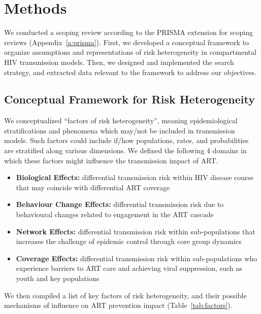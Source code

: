 \section{Methods}
\label{s:meth}
We conducted a scoping review according to the PRISMA extension for scoping reviews
(Appendix~\ref{a:prisma}).
First, we developed a conceptual framework to organize
assumptions and representations of risk heterogeneity
in compartmental HIV transmission models.
Then, we designed and implemented the search strategy,
and extracted data relevant to the framework to address our objectives.
\subsection{Conceptual Framework for Risk Heterogeneity}
\label{ss:meth:framework}
We conceptualized ``factors of risk heterogeneity'', meaning
epidemiological stratifications and phenomena which may/not be included in transmission models.
Such factors could include if/how populations, rates, and probabilities
are stratified along various dimensions.
We defined the following 4 domains in which
these factors might influence the transmission impact of ART.
\begin{itemize}
  \item \textbf{Biological Effects:}
  differential transmission risk within HIV disease course
  that may coincide with differential ART coverage
  \cite{Pilcher2004}
  \item \textbf{Behaviour Change Effects:}
  differential transmission risk due to
  behavioural changes related to engagement in the ART cascade
  \cite{Ramachandran2016,Tiwari2020}
  \item \textbf{Network Effects:}
  differential transmission risk within sub-populations
  that increases the challenge of epidemic control through core group dynamics
  \cite{Boily1997,Watts2010,Dodd2010}
  \item \textbf{Coverage Effects:}
  differential transmission risk within sub-populations
  who experience barriers to ART care and achieving viral suppression,
  such as youth and key populations
  \cite{Mountain2014,Lancaster2016,Hakim2018,Green2020}
\end{itemize}
We then compiled a list of key factors of risk heterogeneity,
and their possible mechanisms of influence on ART prevention impact (Table~\ref{tab:factors}).
\begin{sidewaystable}
  \caption{%
    Factors of heterogeneity in HIV transmission
    and their possible mechanisms of influence on the prevention impact of ART interventions}
  
  \label{tab:factors}
\end{sidewaystable}
